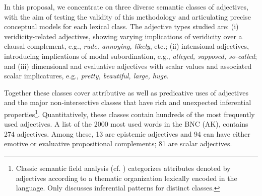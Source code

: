 \documentclass[10pt]{article}
\begin{document}
In this proposal, we concentrate on three diverse semantic classes of adjectives, with the aim of testing the validity of this methodology and articulating precise conceptual models for each lexical class. The adjective types studied are: (i) veridicity-related adjectives, showing varying implications of veridicity over a clausal complement, e.g., \textit{rude, annoying, likely}, etc.; (ii) intensional adjectives, introducing implications of modal subordination, e.g., \textit{alleged, supposed, so-called}; and (iii) dimensional and evaluative adjectives with scalar values and associated scalar implicatures, e.g., \textit{pretty, beautiful, large, huge}. 

Together these classes cover attributive as well as predicative uses of adjectives and the major non-intersective classes that have rich and unexpected inferential properties\footnote{Classic semantic field analysis (cf. \cite{dixon:91,lyons:77,raskin1995lexical}) categorizes attributes denoted by adjectives according to a thematic organization lexically encoded in the language. Only \cite{raskin1995lexical} discusses inferential patterns for distinct classes.}. Quantitatively, these classes contain hundreds of the most frequently used adjectives. A list of the 2000 most used words in the BNC (AK), contains 274 adjectives. Among these, 13 are epistemic adjectives and 94 can have either emotive or evaluative propositional complements; 81 are scalar adjectives. 

\end{document}

